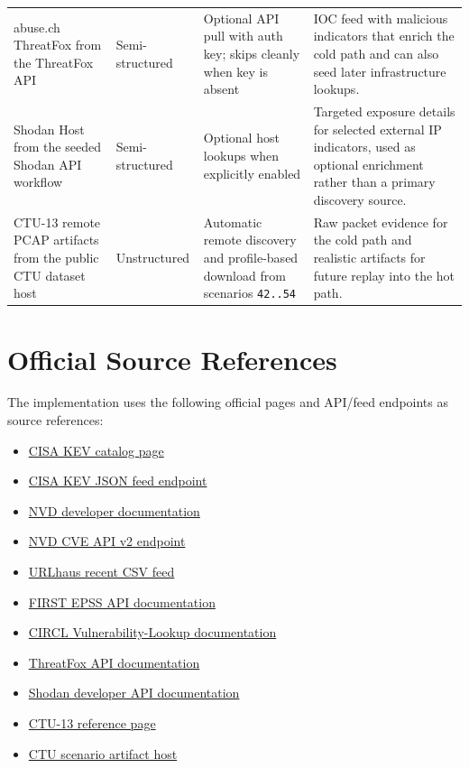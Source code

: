 \documentclass[11pt,a4paper]{article}
\begin{document}
\begin{tabularx}{\textwidth}{>{\raggedright\arraybackslash}p{4.0cm} >{\raggedright\arraybackslash}p{2.0cm} >{\raggedright\arraybackslash}p{3.0cm} >{\raggedright\arraybackslash}X}
abuse.ch ThreatFox from the ThreatFox API & Semi-structured & Optional API pull with auth key; skips cleanly when key is absent & IOC feed with malicious indicators that enrich the cold path and can also seed later infrastructure lookups. \\
Shodan Host from the seeded Shodan API workflow & Semi-structured & Optional host lookups when explicitly enabled & Targeted exposure details for selected external IP indicators, used as optional enrichment rather than a primary discovery source. \\
CTU-13 remote PCAP artifacts from the public CTU dataset host & Unstructured & Automatic remote discovery and profile-based download from scenarios \texttt{42..54} & Raw packet evidence for the cold path and realistic artifacts for future replay into the hot path. \\
\bottomrule
\end{tabularx}

\section{Official Source References}
The implementation uses the following official pages and API/feed endpoints as source references:
\begin{itemize}[leftmargin=1.5em]
  \item \href{https://www.cisa.gov/known-exploited-vulnerabilities}{CISA KEV catalog page}
  \item \href{https://www.cisa.gov/sites/default/files/feeds/known_exploited_vulnerabilities.json}{CISA KEV JSON feed endpoint}
  \item \href{https://nvd.nist.gov/developers/vulnerabilities}{NVD developer documentation}
  \item \href{https://services.nvd.nist.gov/rest/json/cves/2.0}{NVD CVE API v2 endpoint}
  \item \href{https://urlhaus.abuse.ch/downloads/csv_recent/}{URLhaus recent CSV feed}
  \item \href{https://www.first.org/epss/api}{FIRST EPSS API documentation}
  \item \href{https://vulnerability.circl.lu/documentation}{CIRCL Vulnerability-Lookup documentation}
  \item \href{https://threatfox.abuse.ch/api/}{ThreatFox API documentation}
  \item \href{https://developer.shodan.io/api}{Shodan developer API documentation}
  \item \href{https://www.stratosphereips.org/datasets-ctu13}{CTU-13 reference page}
  \item \href{https://mcfp.felk.cvut.cz/publicDatasets/}{CTU scenario artifact host}
\end{itemize}
\end{document}
